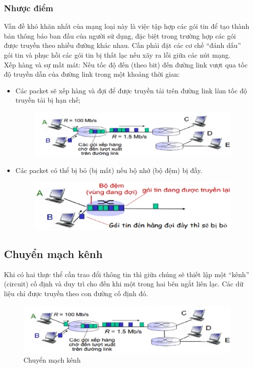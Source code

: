 \documentclass[9pt,twocolumn,twoside,lineno]{gsajnl}
\begin{document}
\subsubsection{Nhược điểm\\}
Vấn đề khó khăn nhất của mạng loại này là việc tập hợp các gói tin để tạo thành bản thông báo ban đầu của người sử dụng, đặc biệt trong trường hợp các gói được truyền theo nhiều đường khác nhau.
Cần phải đặt các cơ chế “đánh dấu” gói tin và phục hồi các gói tin bị thất lạc nếu xãy ra lỗi giữa các nút mạng. \\
Xếp hàng và sự mất mát: Nếu tốc độ đến (theo bit) đến đường link vượt qua tốc độ truyền dẫn của đường link trong một khoảng thời gian:\\

\begin{itemize}
  \item Các packet sẽ xếp hàng và đợi để được truyền tải trên đường link làm tốc độ truyền tải bị hạn chế;
  \begin{figure}[h]
    \centering
    \includegraphics[scale=0.3]{q1_2}
  \end{figure}

  \item Các packet có thể bị bỏ (bị mất) nếu bộ nhớ (bộ đệm) bị đầy.
  \begin{figure}[h]
    \centering
    \includegraphics[scale=0.3]{q1_3}
  \end{figure}

\end{itemize}


\subsection{Chuyển mạch kênh}
Khi có hai thực thể cần trao đổi thông tin thì giữa chúng sẽ thiết lập một “kênh” (circuit) cố định 
và duy trì cho đến khi một trong hai bên ngắt liên lạc. Các dữ liệu chỉ được truyền theo con
đường cố định đó.
\begin{figure}[h]
  \centering
  \includegraphics[scale=0.3]{q1_2}
  \caption{Chuyển mạch kênh}
\end{figure}
\end{document}
